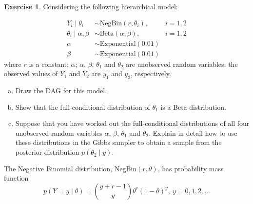 \documentclass{article}
\theoremstyle{plain}
\theoremstyle{definition}
\newtheorem{exercise}{Exercise}
\begin{document}
\begin{exercise}
Considering the following hierarchical model:

\begin{align*}
Y_i \mid \theta_i &\sim \mathrm{NegBin}(r,\theta_i),& i = 1, 2\\
\theta_i\mid \alpha,\beta & \sim \mathrm{Beta}(\alpha,\beta), & i=1,2\\
\alpha &\sim \mathrm{Exponential}(0.01)& \\
\beta & \sim \mathrm{Exponential}(0.01) &
\end{align*}
where $r$ is a constant; $\alpha$; $\alpha$, $\beta$, $\theta_1$ and $\theta_2$ are unobserved random variables; the observed values of $Y_1$ and $Y_2$ are $y_1$ and $y_2$, respectively.
\begin{enumerate}[(a)]
\item Draw the DAG for this model.
\item Show that the full-conditional distribution of $\theta_1$ is a Beta distribution.
\item Suppose that you have worked out the full-conditional distributions
of all four unobserved random variables $\alpha$, $\beta$, $\theta
_1$ and $\theta_2$. Explain in detail how to use these distributions in the Gibbs sampler to obtain a sample from the posterior distribution $p(\theta_2 \mid y)$.
\end{enumerate}
The Negative Binomial distribution, $\mathrm{NegBin}(r,\theta)$, has probability mass function
\[p(Y = y \mid \theta) = \binom{y + r - 1}{y}\theta^r(1 - \theta)^y,\ y = 0, 1, 2, \dots\]

\end{exercise}
\end{document}
